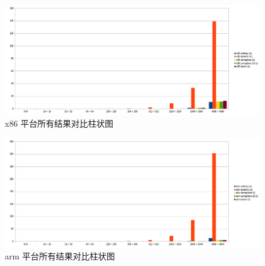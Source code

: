 \documentclass[a4paper]{article}
\begin{document}
\begin{figure}[h]
  \centering
  \includegraphics[width=\textwidth]{x86.png}
  \caption{x86 平台所有结果对比柱状图}
  \label{pic:x86}
\end{figure}

\begin{figure}[h]
  \centering
  \includegraphics[width=\textwidth]{arm.png}
  \caption{arm 平台所有结果对比柱状图}
  \label{pic:arm}
\end{figure}



% 
% 
\end{document}
